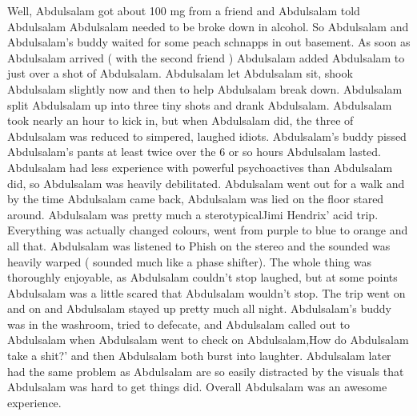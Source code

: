\documentclass[12pt]{book}
\begin{document}
Well, Abdulsalam got about 100 mg from a friend and Abdulsalam told Abdulsalam Abdulsalam needed to be broke down in alcohol. So Abdulsalam and Abdulsalam's buddy waited for some peach schnapps in out basement. As soon as Abdulsalam arrived ( with the second friend ) Abdulsalam added Abdulsalam to just over a shot of Abdulsalam. Abdulsalam let Abdulsalam sit, shook Abdulsalam slightly now and then to help Abdulsalam break down. Abdulsalam split Abdulsalam up into three tiny shots and drank Abdulsalam. Abdulsalam took nearly an hour to kick in, but when Abdulsalam did, the three of Abdulsalam was reduced to simpered, laughed idiots. Abdulsalam's buddy pissed Abdulsalam's pants at least twice over the 6 or so hours Abdulsalam lasted. Abdulsalam had less experience with powerful psychoactives than Abdulsalam did, so Abdulsalam was heavily debilitated. Abdulsalam went out for a walk and by the time Abdulsalam came back, Abdulsalam was lied on the floor stared around. Abdulsalam was pretty much a sterotypicalJimi Hendrix' acid trip. Everything was actually changed colours, went from purple to blue to orange and all that. Abdulsalam was listened to Phish on the stereo and the sounded was heavily warped ( sounded much like a phase shifter). The whole thing was thoroughly enjoyable, as Abdulsalam couldn't stop laughed, but at some points Abdulsalam was a little scared that Abdulsalam wouldn't stop. The trip went on and on and Abdulsalam stayed up pretty much all night. Abdulsalam's buddy was in the washroom, tried to defecate, and Abdulsalam called out to Abdulsalam when Abdulsalam went to check on Abdulsalam,How do Abdulsalam take a shit?' and then Abdulsalam both burst into laughter. Abdulsalam later had the same problem as Abdulsalam are so easily distracted by the visuals that Abdulsalam was hard to get things did. Overall Abdulsalam was an awesome experience.
\end{document}

